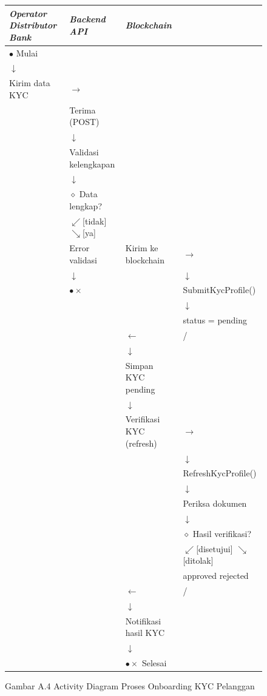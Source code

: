 \documentclass[12pt,a4paper]{article}
\begin{document}
\begin{figure}[H]
\centering
\caption{Gambar A.4 Activity Diagram Proses Onboarding KYC Pelanggan}
\label{fig:ad04}
\begin{tabular}{@{}p{3cm}|p{4cm}|p{4cm}@{}}
\textit{\textbf{Operator Distributor Bank}} & \textit{\textbf{Backend API}} & \textit{\textbf{Blockchain}} \\
\hline
$\bullet$ Mulai & & \\
$\downarrow$ & & \\
Kirim data KYC & $\rightarrow$ & \\
& Terima (POST) & \\
& $\downarrow$ & \\
& Validasi kelengkapan & \\
& $\downarrow$ & \\
& $\diamond$ Data lengkap? & \\
& $\swarrow$[tidak] \hspace{1.3cm} $\searrow$[ya] & \\
& Error validasi & Kirim ke blockchain & $\rightarrow$ \\
& $\downarrow$ & & $\downarrow$ \\
& $\bullet\times$ & & SubmitKycProfile() \\
& & & $\downarrow$ \\
& & & status = pending \\
& & $\leftarrow$ & / \\
& & $\downarrow$ & \\
& & Simpan KYC pending & \\
& & $\downarrow$ & \\
& & Verifikasi KYC (refresh) & $\rightarrow$ \\
& & & $\downarrow$ \\
& & & RefreshKycProfile() \\
& & & $\downarrow$ \\
& & & Periksa dokumen \\
& & & $\downarrow$ \\
& & & $\diamond$ Hasil verifikasi? \\
& & & $\swarrow$[disetujui] \hspace{0.5cm} $\searrow$[ditolak] \\
& & & approved \hspace{1.2cm} rejected \\
& & $\leftarrow$ & / \\
& & $\downarrow$ & \\
& & Notifikasi hasil KYC & \\
& & $\downarrow$ & \\
& & $\bullet\times$ Selesai & \\
\end{tabular}
\end{figure}
\end{document}

